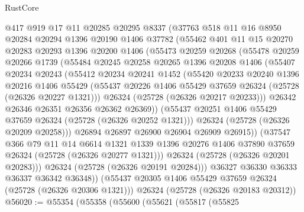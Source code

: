 \begin{lexlean}{RustCore}
\begin{coremodule}
        @417
        @919
        @17
        @11
        @20285
        @20295
        @8337
        (@37763
          @518
          @11
          @16
          @8950
          @20284
          @20294
          @1396
          @20190
          @1406
          @37782
          (@55462
            @401
            @11
            @15
            @20270
            @20283
            @20293
            @1396
            @20200
            @1406
            (@55473
              @20259
              @20268
              (@55478
                @20259
                @20266
                @1739
                (@55484
                  @20245
                  @20258
                  @20265
                  @1396
                  @20208
                  @1406
                  (@55407
                    @20234
                    @20243
                    (@55412
                      @20234
                      @20241
                      @1452
                      (@55420
                        @20233
                        @20240
                        @1396
                        @20216
                        @1406
                        @55429
                        (@55437 @20226 @1406 @55429 @37659 @26324 (@25728 (@26326 @20227 @1321)))
                        @26324
                        (@25728 (@26326 @20217 @20233)))
                      @26342
                      @26346
                      @26351
                      @26356
                      @26362
                      @26369))
                  (@55437 @20251 @1406 @55429 @37659 @26324 (@25728 (@26326 @20252 @1321)))
                  @26324
                  (@25728 (@26326 @20209 @20258)))
                @26894
                @26897
                @26900
                @26904
                @26909
                @26915))
            (@37547
              @366
              @79
              @11
              @14
              @6614
              @1321
              @1339
              @1396
              @20276
              @1406
              @37890
              @37659
              @26324
              (@25728 (@26326 @20277 @1321)))
            @26324
            (@25728 (@26326 @20201 @20283)))
          @26324
          (@25728 (@26326 @20191 @20284)))
        @36327
        @36330
        @36333
        @36337
        @36342
        @36348))
    (@55437 @20305 @1406 @55429 @37659 @26324 (@25728 (@26326 @20306 @1321)))
    @26324
    (@25728 (@26326 @20183 @20312))
@56020 := @55354
    (@55358
      (@55600
        (@55621
          (@55817
            (@55825

\end{coremodule}
\end{lexlean}
